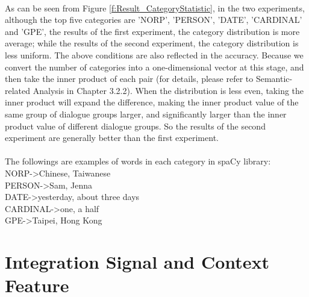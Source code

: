 \documentclass[a4paper,12pt]{report}
\begin{document}
\paragraph{}
As can be seen from Figure \ref{f:Result_CategoryStatistic}, in the two experiments, although the top five categories are 'NORP', 'PERSON', 'DATE', 'CARDINAL' and 'GPE', the results of the first experiment, the category distribution is more average; while the results of the second experiment, the category distribution is less uniform. The above conditions are also reflected in the accuracy. Because we convert the number of categories into a one-dimensional vector at this stage, and then take the inner product of each pair (for details, please refer to Semantic-related Analysis in Chapter 3.2.2). When the distribution is less even, taking the inner product will expand the difference, making the inner product value of the same group of dialogue groups larger, and significantly larger than the inner product value of different dialogue groups. So the results of the second experiment are generally better than the first experiment.
\\ \\
The followings are examples of words in each category in spaCy library:\\
NORP\;->\;Chinese, Taiwanese\\
PERSON\;->\;Sam, Jenna\\
DATE\;->\;yesterday, about three days\\
CARDINAL\;->\;one, a half\\
GPE\;->\;Taipei, Hong Kong
\section{Integration Signal and Context Feature}
\end{document}
